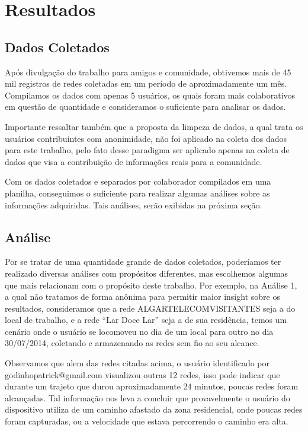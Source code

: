 \documentclass[12pt, %
openright, 
oneside,
a4paper,
brazil]{facom-ufu-abntex2}
\begin{document}
\chapter{Resultados}
\section{Dados Coletados}
Após divulgação do trabalho para amigos e comunidade, obtivemos mais de 45 mil registros de redes coletadas em um período de aproximadamente um mês. Compilamos os dados com apenas 5 usuários, os quais foram mais colaborativos em questão de quantidade e consideramos o suficiente para analisar os dados.

Importante ressaltar também que a proposta da limpeza de dados, a qual trata os usuários contribuintes com anonimidade, não foi aplicado na coleta dos dados para este trabalho, pelo fato desse paradigma ser aplicado apenas na coleta de dados que visa a contribuição de informações reais para a comunidade.

Com os dados coletados e separados por colaborador compilados em uma planilha, conseguimos o suficiente para realizar algumas análises sobre as informações adquiridas.  Tais análises, serão exibidas na próxima seção.

\section{Análise}
Por se tratar de uma quantidade grande de dados coletados, poderíamos ter realizado diversas análises com propósitos diferentes, mas escolhemos algumas que mais relacionam com o propósito deste trabalho. Por exemplo, na Análise 1, a qual não tratamos de forma anônima para permitir maior insight sobre os resultados, consideramos que a rede ALGARTELECOMVISITANTES seja a do local de trabalho, e a rede ``Lar Doce Lar'' seja a de sua residência, temos um cenário onde o usuário se locomoveu no dia  de um local para outro no dia 30/07/2014, coletando e armazenando as redes sem fio ao seu alcance.


Observamos que alem das redes citadas acima, o usuário identificado por godinhopatrick@gmail.com visualizou outras 12 redes, isso pode indicar que durante um trajeto que durou aproximadamente 24 minutos, poucas redes foram alcançadas. Tal informação nos leva a concluir que provavelmente o usuário do dispositivo utiliza de um caminho afastado da zona residencial, onde poucas redes foram capturadas, ou a velocidade que estava percorrendo o caminho era alta.  
 
\end{document}
